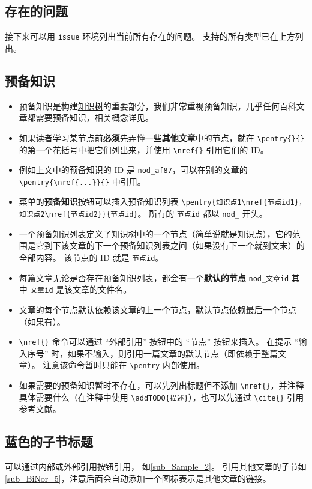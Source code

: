 \subsection{存在的问题}
接下来可以用 \verb`issue` 环境列出当前所有存在的问题。 支持的所有类型已在上方列出。

\subsection{预备知识}
\begin{itemize}
\item 预备知识是构建\href{https://wuli.wiki/tree/}{知识树}的重要部分，我们非常重视预备知识，几乎任何百科文章都需要预备知识，相关概念详见。
\item 如果读者学习某节点前\textbf{必须}先弄懂一些\textbf{其他文章}中的节点，就在 \verb`\pentry{}{}` 的第一个花括号中把它们列出来，并使用 \verb`\nref{}` 引用它们的 ID。
\item 例如上文中的预备知识的 ID 是 \verb`nod_af87`，可以在别的文章的 \verb`\pentry{\nref{...}}{}` 中引用。
\item 菜单的\textbf{预备知识}按钮可以插入预备知识列表 \verb`\pentry{知识点1\nref{节点id1}，知识点2\nref{节点id2}}{节点id}`。 所有的 \verb`节点id` 都以 \verb`nod_` 开头。
\item 一个预备知识列表定义了\href{https://wuli.wiki/tree/}{知识树}中的一个节点（简单说就是知识点），它的范围是它到下该文章的下一个预备知识列表之间（如果没有下一个就到文末）的全部内容。 该节点的 ID 就是 \verb`节点id`。
\item 每篇文章无论是否存在预备知识列表，都会有一个\textbf{默认的节点} \verb`nod_文章id` 其中 \verb`文章id` 是该文章的文件名。
\item 文章的每个节点默认依赖该文章的上一个节点，默认节点依赖最后一个节点（如果有）。
\item \verb`\nref{}` 命令可以通过 “外部引用” 按钮中的 “节点” 按钮来插入。 在提示 “输入序号” 时，如果不输入，则引用一篇文章的默认节点（即依赖于整篇文章）。 注意该命令暂时只能在 \verb`\pentry` 内部使用。
\item 如果需要的预备知识暂时不存在，可以先列出标题但不添加 \verb`\nref{}`，并注释具体需要什么（在注释中使用 \verb`\addTODO{描述}`），也可以先通过 \verb`\cite{}` 引用参考文献。
\end{itemize}

\subsection{蓝色的子节标题}\label{sub_Sample_2}
可以通过内部或外部引用按钮引用， 如\autoref{sub_Sample_2}。 引用其他文章的子节如\autoref{sub_BiNor_5}，注意后面会自动添加一个图标表示是其他文章的链接。

